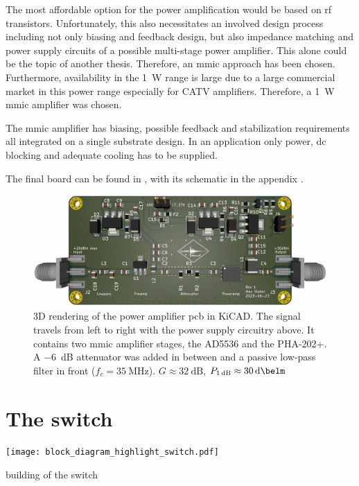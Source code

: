 The most affordable option for the power amplification would be based on \acrshort{rf} transistors. Unfortunately, this also necessitates an involved design process including not only biasing and feedback design, but also impedance matching and power supply circuits of a possible multi-stage power amplifier. This alone could be the topic of another thesis. Therefore, an \acrshort{mmic} approach has been chosen. Furthermore, availability in the \qty{1}{\watt} range is large due to a large commercial market in this power range especially for CATV amplifiers. Therefore, a \qty{1}{\watt} \acrshort{mmic} amplifier was chosen.

The \acrfull{mmic} amplifier has biasing, possible feedback and stabilization requirements all integrated on a single substrate design. In an application only power, \acrshort{dc} blocking and adequate cooling has to be supplied.

The final board can be found in , with its schematic in the appendix .

\begin{figure}[hbt]
    \centering
    \includegraphics{images/poweramp.png}
    \caption{ 3D rendering of the power amplifier \acrshort{pcb} in KiCAD. The signal travels from left to right with the power supply circuitry above. It contains two \acrshort{mmic} amplifier stages, the AD5536 and the PHA-202+. A \qty{-6}{\deci\bel} attenuator was added in between and a passive low-pass filter in front (\(f_c = \qty{35}{\mega\hertz}\)). \(G \approx \qty{32}{\deci\bel}\), \(P_{\qty{1}{\deci\bel}} \approx \qty{+30}{\deci\belm}\)}
\end{figure}

\section{The switch}
\begin{marginfigure}[-4.5\baselineskip]
    \texttt{[image: block\_diagram\_highlight\_switch.pdf]}
\end{marginfigure}
building of the switch


